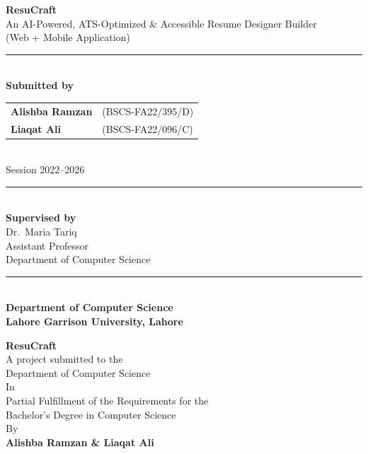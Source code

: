 \documentclass[12pt, a4paper, oneside]{report}
\begin{document}
\begin{titlepage}
  \centering
  \vspace*{0.5cm}
  {\LARGE \textbf{ResuCraft}}\\[0.4cm]
  {\large An AI-Powered, ATS-Optimized \& Accessible Resume Designer Builder}\\[0.2cm]
  {\normalsize (Web + Mobile Application)}\\[1.5cm]

  \rule{\linewidth}{0.5mm}\\[0.4cm]
  {\large \textbf{Submitted by}}\\[0.4cm]
  \begin{tabular}{ll}
    \textbf{Alishba Ramzan} & (BSCS-FA22/395/D) \\
    \textbf{Liaqat Ali}     & (BSCS-FA22/096/C) \\
  \end{tabular}\\[0.4cm]
  {\normalsize Session 2022--2026}\\[1.2cm]
  \rule{\linewidth}{0.5mm}\\[1cm]

  {\large \textbf{Supervised by}}\\[0.3cm]
  {\large Dr.\ Maria Tariq}\\[0.2cm]
  {\normalsize Assistant Professor}\\[0.1cm]
  {\normalsize Department of Computer Science}\\[1cm]

  \rule{\linewidth}{0.5mm}\\[0.4cm]
  {\large \textbf{Department of Computer Science}}\\[0.2cm]
  {\large \textbf{Lahore Garrison University, Lahore}}\\[0.3cm]
  {\normalsize \the\year}
\end{titlepage}

\newpage
\thispagestyle{empty}
\begin{center}
  {\Large \textbf{ResuCraft}}\\[0.5cm]
  A project submitted to the\\
  Department of Computer Science\\[0.3cm]
  In\\[0.3cm]
  Partial Fulfillment of the Requirements for the\\
  Bachelor's Degree in Computer Science\\[1cm]
  By\\[0.4cm]
  \textbf{Alishba Ramzan \& Liaqat Ali}
\end{center}
\end{document}
